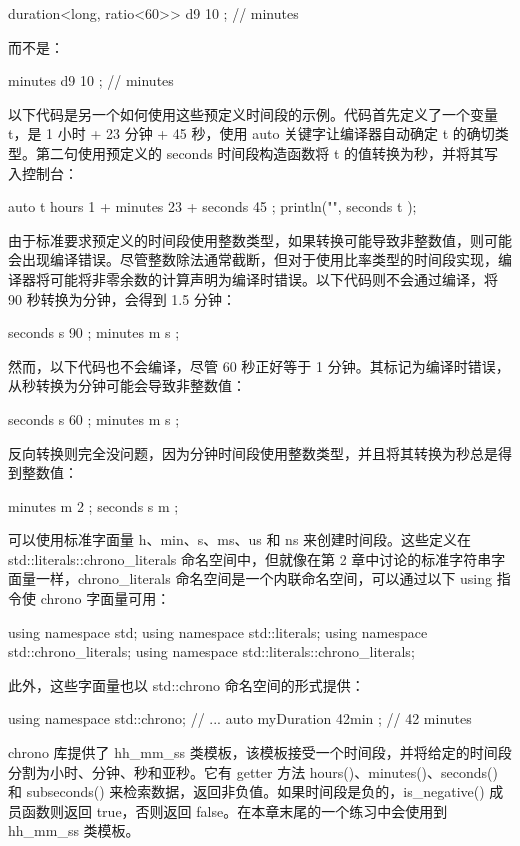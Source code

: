 \begin{cpp}
duration<long, ratio<60>> d9 { 10 }; // minutes
\end{cpp}

而不是：

\begin{cpp}
minutes d9 { 10 }; // minutes
\end{cpp}

以下代码是另一个如何使用这些预定义时间段的示例。代码首先定义了一个变量 t，是 1 小时 + 23 分钟 + 45 秒，使用 auto 关键字让编译器自动确定 t 的确切类型。第二句使用预定义的 seconds 时间段构造函数将 t 的值转换为秒，并将其写入控制台：

\begin{cpp}
auto t { hours { 1 } + minutes { 23 } + seconds { 45 } };
println("{}", seconds { t });
\end{cpp}

由于标准要求预定义的时间段使用整数类型，如果转换可能导致非整数值，则可能会出现编译错误。尽管整数除法通常截断，但对于使用比率类型的时间段实现，编译器将可能将非零余数的计算声明为编译时错误。以下代码则不会通过编译，将 90 秒转换为分钟，会得到 1.5 分钟：

\begin{cpp}
seconds s { 90 };
minutes m { s };
\end{cpp}

然而，以下代码也不会编译，尽管 60 秒正好等于 1 分钟。其标记为编译时错误，从秒转换为分钟可能会导致非整数值：

\begin{cpp}
seconds s { 60 };
minutes m { s };
\end{cpp}

反向转换则完全没问题，因为分钟时间段使用整数类型，并且将其转换为秒总是得到整数值：

\begin{cpp}
minutes m { 2 };
seconds s { m };
\end{cpp}


可以使用标准字面量 h、min、s、ms、us 和 ns 来创建时间段。这些定义在 std::literals::chrono\_literals 命名空间中，但就像在第 2 章中讨论的标准字符串字面量一样，chrono\_literals 命名空间是一个内联命名空间，可以通过以下 using 指令使 chrono 字面量可用：

\begin{cpp}
using namespace std;
using namespace std::literals;
using namespace std::chrono_literals;
using namespace std::literals::chrono_literals;
\end{cpp}

此外，这些字面量也以 std::chrono 命名空间的形式提供：

\begin{cpp}
using namespace std::chrono;
// ...
auto myDuration { 42min }; // 42 minutes
\end{cpp}


chrono 库提供了 hh\_mm\_ss 类模板，该模板接受一个时间段，并将给定的时间段分割为小时、分钟、秒和亚秒。它有 getter 方法 hours()、minutes()、seconds() 和 subseconds() 来检索数据，返回非负值。如果时间段是负的，is\_negative() 成员函数则返回 true，否则返回 false。在本章末尾的一个练习中会使用到 hh\_mm\_ss 类模板。
